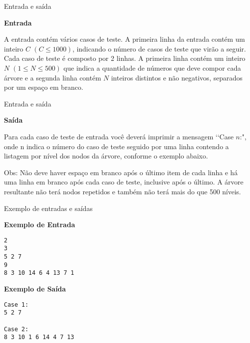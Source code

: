 \begin{frame}[fragile]{Entrada e saída}

\textbf{Entrada}

A entrada contém vários casos de teste. A primeira linha da entrada contém um inteiro $C$ $(C \leq 1000)$, indicando o número de casos de teste que virão a seguir. Cada caso de teste é composto por 2 linhas. A primeira linha contém um inteiro $N$ $(1 \leq N \leq 500)$ que indica a quantidade de números que deve compor cada árvore e a segunda linha contém $N$ inteiros distintos e não negativos, separados por um espaço em branco.

\end{frame}

\begin{frame}[fragile]{Entrada e saída}

\textbf{Saída}

Para cada caso de teste de entrada você deverá imprimir a mensagem \lq\lq Case $n$:", onde n indica o número do caso de teste seguido por uma linha contendo a listagem por nível dos nodos da árvore, conforme o exemplo abaixo. 

Obs: Não deve haver espaço em branco após o último item de cada linha e há uma linha em branco após cada caso de teste, inclusive após o último. A árvore resultante não terá nodos repetidos e também não terá mais do que 500 níveis.

\end{frame}


\begin{frame}[fragile]{Exemplo de entradas e saídas}

\begin{minipage}[t]{0.5\textwidth}
\textbf{Exemplo de Entrada}
\begin{verbatim}
2
3
5 2 7
9
8 3 10 14 6 4 13 7 1
\end{verbatim}
\end{minipage}
\begin{minipage}[t]{0.45\textwidth}
\textbf{Exemplo de Saída}
\begin{verbatim}
Case 1:
5 2 7

Case 2:
8 3 10 1 6 14 4 7 13
\end{verbatim}
\end{minipage}
\end{frame}

